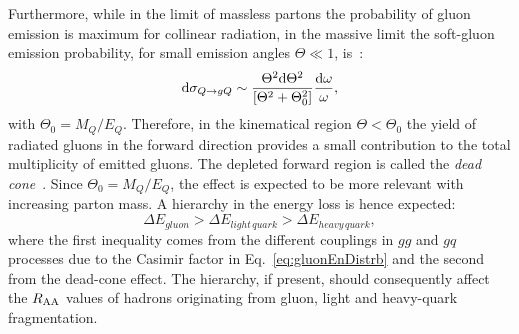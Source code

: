 Furthermore, while in the limit of massless partons the probability of 
gluon emission is maximum for collinear radiation,
in the massive limit the soft-gluon emission probability, for small 
emission angles $\Theta \ll 1$, is~\cite{Dokshitzer:1991fd}:
\begin{equation}
\label{eq:DeadCone}
{\rm d} \sigma_{Q \rightarrow gQ } \sim \frac{\Theta^2 {\rm d} \Theta^2}{[\Theta^2+ \Theta^2_0]} \frac{{\rm d} \omega}{\omega},
\end{equation}
with $\Theta_0 = M_Q/E_Q$.
Therefore, in the kinematical region $\Theta < \Theta_0$ the yield of radiated gluons
in the forward direction provides a small contribution to the total multiplicity of emitted gluons. 
The depleted forward region is called the {\it dead cone}~\cite{Dokshitzer:1991fd}.
Since $\Theta_0 = M_Q/E_Q$, the effect is expected to be more 
relevant with increasing parton mass. A hierarchy in 
the energy loss is hence expected:
\begin{equation}
\label{eq:HierachyRaa}
\Delta E_{gluon} > \Delta E_{light\, quark} > \Delta E_{heavy\, quark},
\end{equation}
where the first inequality comes from the different couplings in $gg$ and $gq$ 
processes due to the Casimir factor in Eq.~\ref{eq:gluonEnDistrb} 
and the second from the dead-cone effect. The hierarchy, if present, 
should consequently affect the $R_{\rm AA}$ values of hadrons originating from
gluon, light and heavy-quark fragmentation.\\


